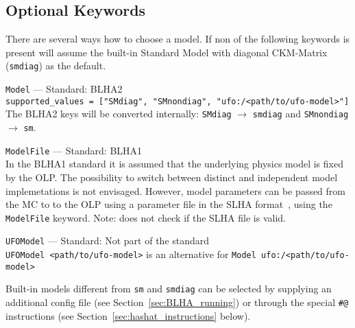 %
%
%

\subsection{Optional Keywords}\label{sec:optional_BLHA_keywords}
There are several ways how to choose a model. If non of the following keywords is present \gosam will assume the built-in Standard Model with diagonal CKM-Matrix (\texttt{smdiag}) as the default.
\begin{basedescript}{\desclabelstyle{\pushlabel}}
    \item[\hspace{-1em}]\colorbox{gray!30}{\lstinline[style=in]|Model|} --- Standard: BLHA2\vspace{0.1cm}\\
        \lstinline[style=in]|supported_values = ["SMdiag", "SMnondiag", "ufo:/<path/to/ufo-model>"]|\\
        The BLHA2 keys will be converted internally: \texttt{SMdiag} $\to$ \texttt{smdiag} and \texttt{SMnondiag} $\to$ \texttt{sm}.
    \item[\hspace{-1em}]\colorbox{gray!30}{\lstinline[style=in]|ModelFile|} --- Standard: BLHA1\vspace{0.1cm}\\
        In the BLHA1 standard it is assumed that the underlying physics model is fixed by the OLP. The possibility to switch between distinct and independent model implemetations is not envisaged. However, model parameters can be passed from the MC to to the OLP using a parameter file in the SLHA format~\cite{Skands:2003cj,Allanach:2008qq}, using the \texttt{ModelFile} keyword. Note: \gosam does not check if the SLHA file is valid.
    \item[\hspace{-1em}]\colorbox{gray!30}{\lstinline[style=in]|UFOModel|} --- Standard: Not part of the standard\vspace{0.1cm}\\
        \lstinline[style=in]|UFOModel <path/to/ufo-model>| is an alternative for \lstinline[style=in]|Model ufo:/<path/to/ufo-model>|
\end{basedescript}
Built-in models different from \texttt{sm} and \texttt{smdiag} can be selected by supplying an additional config file (see Section~\ref{sec:BLHA_running}) or through the special \texttt{\#@} instructions (see Section~\ref{sec:hashat_instructions} below).\\

